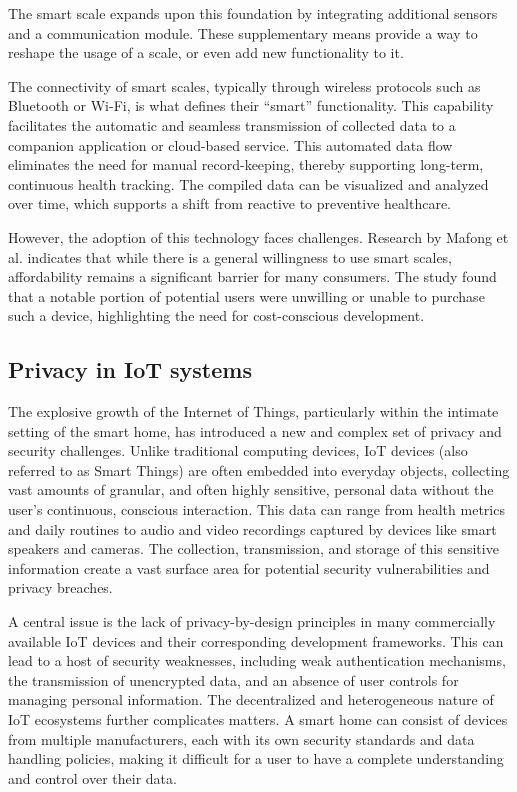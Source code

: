\documentclass[12pt]{article}
\begin{document}
The smart scale expands upon this foundation by integrating additional sensors and a communication module. These supplementary means provide a way to reshape the usage of a scale, or even add new functionality to it.

The connectivity of smart scales, typically through wireless protocols such as Bluetooth or Wi-Fi, is what defines their ``smart'' functionality. This capability facilitates the automatic and seamless transmission of collected data to a companion application or cloud-based service. This automated data flow eliminates the need for manual record-keeping, thereby supporting long-term, continuous health tracking. The compiled data can be visualized and analyzed over time, which supports a shift from reactive to preventive healthcare. 

However, the adoption of this technology faces challenges. Research by Mafong et al. \cite{mafong2020willing} indicates that while there is a general willingness to use smart scales, affordability remains a significant barrier for many consumers. The study found that a notable portion of potential users were unwilling or unable to purchase such a device, highlighting the need for cost-conscious development.

\subsection{Privacy in IoT systems}

The explosive growth of the Internet of Things, particularly within the intimate setting of the smart home, has introduced a new and complex set of privacy and security challenges. Unlike traditional computing devices, IoT devices (also referred to as Smart Things) are often embedded into everyday objects, collecting vast amounts of granular, and often highly sensitive, personal data without the user's continuous, conscious interaction. This data can range from health metrics and daily routines to audio and video recordings captured by devices like smart speakers and cameras. The collection, transmission, and storage of this sensitive information create a vast surface area for potential security vulnerabilities and privacy breaches.

A central issue is the lack of privacy-by-design principles in many commercially available IoT devices and their corresponding development frameworks. This can lead to a host of security weaknesses, including weak authentication mechanisms, the transmission of unencrypted data, and an absence of user controls for managing personal information. The decentralized and heterogeneous nature of IoT ecosystems further complicates matters. A smart home can consist of devices from multiple manufacturers, each with its own security standards and data handling policies, making it difficult for a user to have a complete understanding and control over their data.
\end{document}
